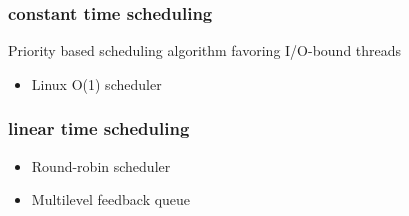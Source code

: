 \documentclass[11pt]{article}
\begin{document}
\subsubsection{constant time scheduling}
\label{sec-1_2_1}

Priority based scheduling algorithm favoring I/O-bound threads
\begin{itemize}

\item Linux O(1) scheduler\\
\label{sec-1_2_1_1}%
\end{itemize} %
\subsubsection{linear time scheduling}
\label{sec-1_2_2}
\begin{itemize}

\item Round-robin scheduler\\
\label{sec-1_2_2_1}%
\item Multilevel feedback queue\\
\label{sec-1_2_2_2}%
\end{itemize} %
\end{document}
